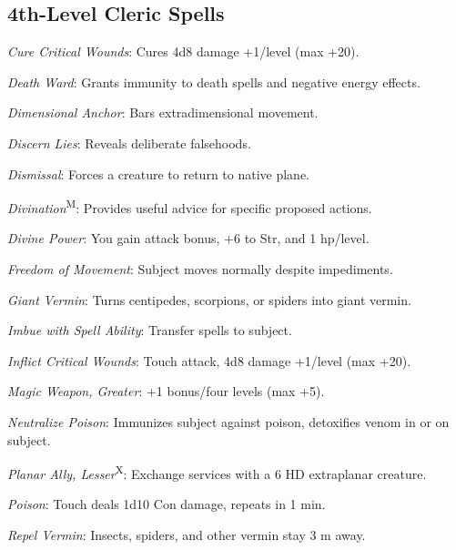 




\subsection{4th-Level Cleric Spells}



\textit{Cure Critical Wounds}: Cures 4d8 damage +1/level (max +20).

\textit{Death Ward}: Grants immunity to death spells and negative energy effects.

\textit{Dimensional Anchor}: Bars extradimensional movement.

\textit{Discern Lies}: Reveals deliberate falsehoods.

\textit{Dismissal}: Forces a creature to return to native plane.

\textit{Divination}\textsuperscript{M}: Provides useful advice for specific proposed actions.

\textit{Divine Power}: You gain attack bonus, +6 to Str, and 1 hp/level.

\textit{Freedom of Movement}: Subject moves normally despite impediments.

\textit{Giant Vermin}: Turns centipedes, scorpions, or spiders into giant vermin.

\textit{Imbue with Spell Ability}: Transfer spells to subject.

\textit{Inflict Critical Wounds}: Touch attack, 4d8 damage +1/level (max +20).

\textit{Magic Weapon, Greater}: +1 bonus/four levels (max +5).

\textit{Neutralize Poison}: Immunizes subject against poison, detoxifies venom in or on subject.

\textit{Planar Ally, Lesser}\textsuperscript{X}: Exchange services with a 6 HD extraplanar creature.

\textit{Poison}: Touch deals 1d10 Con damage, repeats in 1 min.

\textit{Repel Vermin}: Insects, spiders, and other vermin stay 3 m away.

